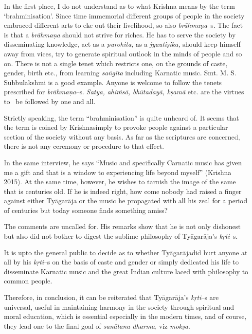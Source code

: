 In the first place, I do not understand as to what Krishna means by the term ‘brahminisation’. Since time immemorial different groups of people in the society embraced different arts to eke out their livelihood, so also \textit{brāhmaṇa}–s. The fact is that a \textit{brāhmaṇa} should not strive for riches. He has to serve the society by disseminating knowledge, act as a \textit{purohita,} as a \textit{jyautiṣika,} should keep himself away from vices, try to generate spiritual outlook in the minds of people and so on. There is not a single tenet which restricts one, on the grounds of caste, gender, birth etc., from learning \textit{saṅgīta} including Karnatic music. Smt. M. S. Subbulakshmi is a good example. Anyone is welcome to follow the tenets prescribed for \textit{brāhmaṇa}–s. \textit{Satya, ahiṁsā, bhūtadayā, kṣamā} etc. are the virtues to  be followed by one and all. 

Strictly speaking, the term “brahminisation” is quite unheard of. It seems that the term is coined by Krishnasimply to provoke people against a particular section of the society without any basis. As far as the scriptures are concerned, there is not any ceremony or procedure to that effect.

In the same interview, he says “Music and specifically Carnatic music has given me a gift and that is a window to experiencing life beyond myself” (Krishna 2015). At the same time, however, he wishes to tarnish the image of the same that is centuries old. If he is indeed right, how come nobody had raised a finger against either Tyāgarāja or the music he propagated with all his zeal for a period of centuries but today someone finds something amiss? 

The comments are uncalled for. His remarks show that he is not only dishonest but also did not bother to digest the sublime philosophy of Tyāgarāja’s \textit{kṛti}–s. 

It is upto the general public to decide as to whether Tyāgarājadid hurt anyone at all by his \textit{kṛti}–s on the basis of caste and gender or simply dedicated his life to disseminate Karnatic music and the great Indian culture laced with philosophy to common people.

Therefore, in conclusion, it can be reiterated that Tyāgarāja’s \textit{kṛti}–s are universal, useful in maintaining harmony in the society through spiritual and moral education, which is essential especially in the modern times, and of course, they lead one to the final goal of \textit{sanātana dharma}, viz \textit{mokṣa}.


